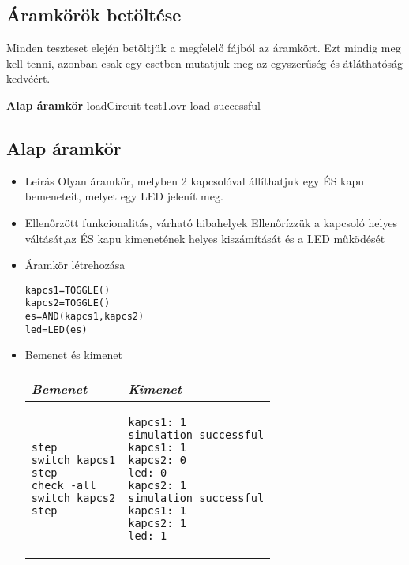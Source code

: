 \subsection{Áramkörök betöltése}
Minden teszteset elején betöltjük a megfelelő fájból az áramkört. Ezt mindig meg kell tenni, azonban csak egy esetben mutatjuk meg az egyszerűség és átláthatóság kedvéért.

\textbf{Alap áramkör}\newline
loadCircuit test1.ovr\newline
\newline
load successful


\subsection{Alap áramkör}
\begin{itemize}
\item Leírás\newline
Olyan áramkör, melyben 2 kapcsolóval állíthatjuk egy ÉS kapu bemeneteit, melyet egy LED jelenít meg.
\item Ellenőrzött funkcionalitás, várható hibahelyek\newline
Ellenőrízzük a kapcsoló helyes váltását,az ÉS kapu kimenetének helyes kiszámítását és a LED működését
\item Áramkör létrehozása

\begin{verbatim}
kapcs1=TOGGLE()
kapcs2=TOGGLE()
es=AND(kapcs1,kapcs2)
led=LED(es)
\end{verbatim}

\item Bemenet és kimenet\newline

\begin{tabular}{|p{5cm}|p{5cm}|} 
\hline 
\textit{Bemenet} & \textit{Kimenet} \\ \hline
\begin{verbatim}
step
switch kapcs1
step
check -all
switch kapcs2
step
\end{verbatim}
& 
\begin{verbatim}
kapcs1: 1
simulation successful
kapcs1: 1
kapcs2: 0
led: 0
kapcs2: 1
simulation successful
kapcs1: 1
kapcs2: 1
led: 1
\end{verbatim}
\\ \hline
\end{tabular}

\end{itemize}

